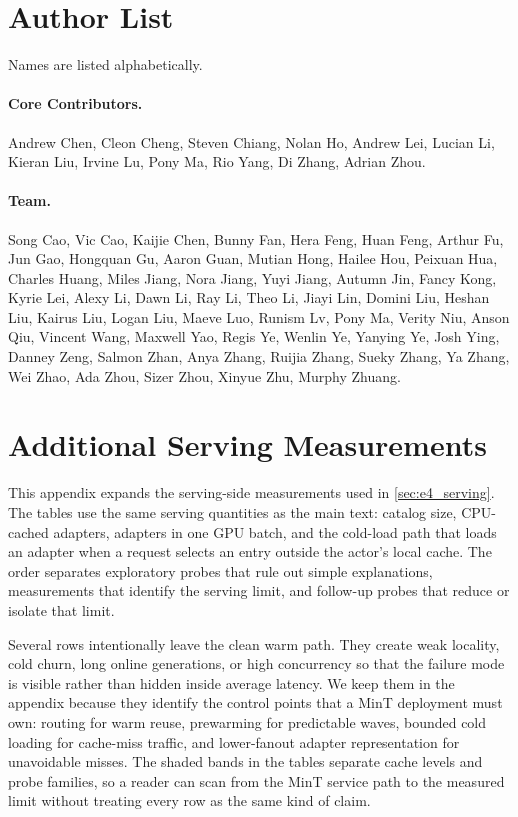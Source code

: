 \section{Author List}
\label{app:author_list}

Names are listed alphabetically.

\paragraph{Core Contributors.}
\begin{sloppypar}
Andrew Chen, Cleon Cheng, Steven Chiang, Nolan Ho, Andrew Lei, Lucian Li, Kieran Liu, Irvine Lu, Pony Ma, Rio Yang, Di Zhang, Adrian Zhou.
\end{sloppypar}

\paragraph{Team.}
\begin{sloppypar}
Song Cao, Vic Cao, Kaijie Chen, Bunny Fan, Hera Feng, Huan Feng, Arthur Fu, Jun Gao, Hongquan Gu, Aaron Guan, Mutian Hong, Hailee Hou, Peixuan Hua, Charles Huang, Miles Jiang, Nora Jiang, Yuyi Jiang, Autumn Jin, Fancy Kong, Kyrie Lei, Alexy Li, Dawn Li, Ray Li, Theo Li, Jiayi Lin, Domini Liu, Heshan Liu, Kairus Liu, Logan Liu, Maeve Luo, Runism Lv, Pony Ma, Verity Niu, Anson Qiu, Vincent Wang, Maxwell Yao, Regis Ye, Wenlin Ye, Yanying Ye, Josh Ying, Danney Zeng, Salmon Zhan, Anya Zhang, Ruijia Zhang, Sueky Zhang, Ya Zhang, Wei Zhao, Ada Zhou, Sizer Zhou, Xinyue Zhu, Murphy Zhuang.
\end{sloppypar}

\section{Additional Serving Measurements}
\label{app:serving}

This appendix expands the serving-side measurements used in \cref{sec:e4_serving}. The tables use the same serving quantities as the main text: catalog size, CPU-cached adapters, adapters in one GPU batch, and the cold-load path that loads an adapter when a request selects an entry outside the actor's local cache. The order separates exploratory probes that rule out simple explanations, measurements that identify the serving limit, and follow-up probes that reduce or isolate that limit.

Several rows intentionally leave the clean warm path. They create weak locality, cold churn, long online generations, or high concurrency so that the failure mode is visible rather than hidden inside average latency. We keep them in the appendix because they identify the control points that a MinT deployment must own: routing for warm reuse, prewarming for predictable waves, bounded cold loading for cache-miss traffic, and lower-fanout adapter representation for unavoidable misses. The shaded bands in the tables separate cache levels and probe families, so a reader can scan from the MinT service path to the measured limit without treating every row as the same kind of claim.


